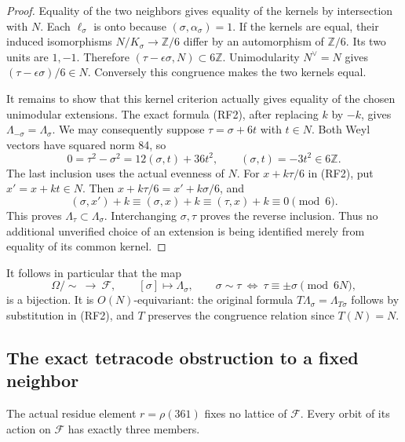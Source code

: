 \begin{proof}
Equality of the two neighbors gives equality of the kernels by
intersection with $N$.
Each $\ell_\sigma$ is onto because
$(\sigma,\alpha_\sigma)=1$.
If the kernels are equal, their induced isomorphisms
$N/K_\sigma\to\mathbb Z/6$ differ by an automorphism of
$\mathbb Z/6$. Its two units are $1,-1$.
Therefore $(\tau-\epsilon\sigma,N)\subset6\mathbb Z$.
Unimodularity $N^\vee=N$ gives
$(\tau-\epsilon\sigma)/6\in N$.
Conversely this congruence makes the two kernels equal.

It remains to show that this kernel criterion actually gives
equality of the chosen unimodular extensions.
The exact formula (RF2), after replacing $k$ by $-k$, gives
$\Lambda_{-\sigma}=\Lambda_\sigma$.
We may consequently suppose $\tau=\sigma+6t$ with $t\in N$.
Both Weyl vectors have squared norm 84, so
\[
 0=\tau^2-\sigma^2=12(\sigma,t)+36t^2,\qquad
                       (\sigma,t)=-3t^2\in6\mathbb Z.
 \tag{RF4}
\]
The last inclusion uses the actual evenness of $N$.
For $x+k\tau/6$ in (RF2), put $x'=x+kt\in N$.
Then $x+k\tau/6=x'+k\sigma/6$, and
\[
 (\sigma,x')+k
 \equiv(\sigma,x)+k
 \equiv(\tau,x)+k\equiv0\pmod6.
\]
This proves $\Lambda_\tau\subset\Lambda_\sigma$.
Interchanging $\sigma,\tau$ proves the reverse inclusion.
Thus no additional unverified choice of an extension is being
identified merely from equality of its common kernel.
\end{proof}

It follows in particular that the map
\[
 \Omega/{\sim}\ \longrightarrow\ \mathscr F,\qquad
 [\sigma]\longmapsto\Lambda_\sigma,\qquad
 \sigma\sim\tau\ \Longleftrightarrow\
                          \tau\equiv\pm\sigma\pmod{6N},
 \tag{RF5}
\]
is a bijection. It is $O(N)$-equivariant: the original formula
$T\Lambda_\sigma=\Lambda_{T\sigma}$ follows by substitution in
(RF2), and $T$ preserves the congruence relation since $T(N)=N$.

\subsection{The exact tetracode obstruction to a fixed neighbor}

\begin{theorem}
\label{esrf:thm:no-fixed-neighbor}
The actual residue element $r=\rho(361)$ fixes no lattice of
$\mathscr F$. Every orbit of its action on $\mathscr F$ has
exactly three members.
\end{theorem}

